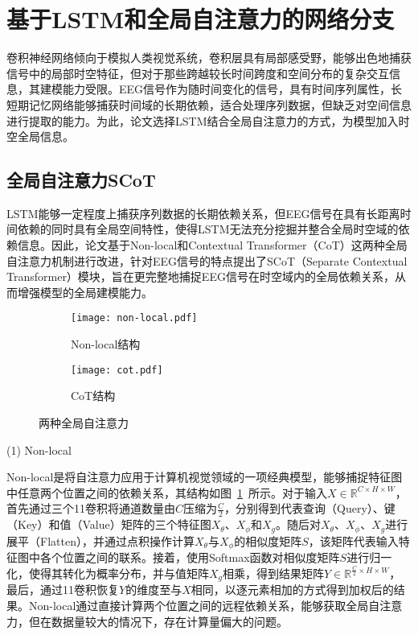 \section{基于LSTM和全局自注意力的网络分支}

卷积神经网络倾向于模拟人类视觉系统，卷积层具有局部感受野，能够出色地捕获信号中的局部时空特征，但对于那些跨越较长时间跨度和空间分布的复杂交互信息，其建模能力受限。EEG信号作为随时间变化的信号，具有时间序列属性，长短期记忆网络能够捕获时间域的长期依赖，适合处理序列数据，但缺乏对空间信息进行提取的能力。为此，论文选择LSTM结合全局自注意力的方式，为模型加入时空全局信息。

\subsection{全局自注意力SCoT}

LSTM能够一定程度上捕获序列数据的长期依赖关系，但EEG信号在具有长距离时间依赖的同时具有全局空间特性，使得LSTM无法充分挖掘并整合全局时空域的依赖信息。因此，论文基于Non-local\cite{wang2018non}和Contextual Transformer（CoT）\cite{li2022contextual}这两种全局自注意力机制进行改进，针对EEG信号的特点提出了SCoT（Separate Contextual Transformer）模块，旨在更完整地捕捉EEG信号在时空域内的全局依赖关系，从而增强模型的全局建模能力。
\begin{figure}[h]
    \centering
    \begin{subfigure}{0.4\textwidth}
      \texttt{[image: non-local.pdf]}
      \caption{Non-local结构}
      \label{fig:non-local}
    \end{subfigure}\qquad
    \begin{subfigure}{0.4\textwidth}
      \texttt{[image: cot.pdf]}
      \caption{CoT结构}
      \label{fig:cot}
    \end{subfigure}
    \caption{两种全局自注意力}
    \label{fig:self}
\end{figure}

(1) Non-local

Non-local是将自注意力\cite{vaswani2017attention}应用于计算机视觉领域的一项经典模型，能够捕捉特征图中任意两个位置之间的依赖关系，其结构如图~\ref{fig:non-local}~所示。对于输入\(X \in \mathbb{R}^{C \times H \times W}\)，首先通过三个1\times1卷积将通道数量由\(C\)压缩为\(\frac{C}{2}\)，分别得到代表查询（Query）、键（Key）和值（Value）矩阵的三个特征图\(X_\theta\)、\(X_\phi\)和\(X_g\)。随后对\(X_\theta\)、\(X_\phi\)、\(X_g\)进行展平（Flatten），并通过点积操作计算\(X_\theta\)与\(X_\phi\)的相似度矩阵\(S\)，该矩阵代表输入特征图中各个位置之间的联系。接着，使用Softmax函数对相似度矩阵\(S\)进行归一化，使得其转化为概率分布，并与值矩阵\(X_g\)相乘，得到结果矩阵\(Y \in \mathbb{R}^{\frac{C}{2} \times H \times W}\)，最后，通过1\times1卷积恢复\(Y\)的维度至与\(X\)相同，以逐元素相加的方式得到加权后的结果。Non-local通过直接计算两个位置之间的远程依赖关系，能够获取全局自注意力，但在数据量较大的情况下，存在计算量偏大的问题。

